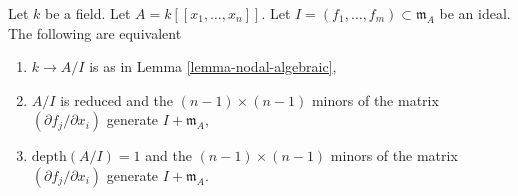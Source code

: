 \begin{lemma}
\label{lemma-fitting-ideal}
Let $k$ be a field. Let $A = k[[x_1, \ldots, x_n]]$. Let
$I = (f_1, \ldots, f_m) \subset \mathfrak m_A$ be an ideal. The following
are equivalent
\begin{enumerate}
\item $k \to A/I$ is as in Lemma \ref{lemma-nodal-algebraic},
\item $A/I$ is reduced and the
$(n - 1) \times (n - 1)$ minors of the matrix
$(\partial f_j/\partial x_i)$ generate $I + \mathfrak m_A$,
\item $\text{depth}(A/I) = 1$ and the
$(n - 1) \times (n - 1)$ minors of the matrix
$(\partial f_j/\partial x_i)$ generate $I + \mathfrak m_A$.
\end{enumerate}
\end{lemma}


